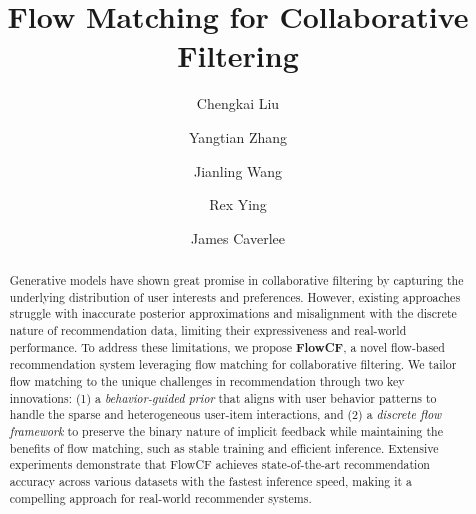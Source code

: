 \documentclass[sigconf]{acmart}
\begin{document}
\newcommand{\ours}{{FlowCF}\xspace}

\title{Flow Matching for Collaborative Filtering}


\author{Chengkai Liu}

\author{Yangtian Zhang}
\authornotemark[1]

\author{Jianling Wang}

\author{Rex Ying}


\author{James Caverlee}


\begin{abstract}
Generative models have shown great promise in collaborative filtering by capturing the underlying distribution of user interests and preferences. However, existing approaches struggle with inaccurate posterior approximations and misalignment with the discrete nature of recommendation data, limiting their expressiveness and real-world performance. 
To address these limitations, we propose \textbf{\ours}, a novel flow-based recommendation system leveraging flow matching for collaborative filtering. 
We tailor flow matching to the unique challenges in recommendation through two key innovations: (1) a \textit{behavior-guided prior} that aligns with user behavior patterns to handle the sparse and heterogeneous user-item interactions, and (2) a \textit{discrete flow framework} to preserve the binary nature of implicit feedback while maintaining the benefits of flow matching, such as stable training and efficient inference.
Extensive experiments demonstrate that \ours achieves state-of-the-art recommendation accuracy across various datasets with the fastest inference speed, making it a compelling approach for real-world recommender systems.


\end{abstract}

\end{document}
